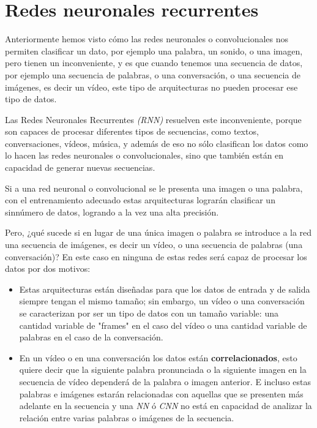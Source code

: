 \documentclass[a4paper,12pt]{article}
\begin{document}
\section{Redes neuronales recurrentes}
Anteriormente hemos visto cómo las redes neuronales o convolucionales nos permiten clasificar un dato, por ejemplo una palabra, un sonido, o una imagen, pero tienen un inconveniente, y es que cuando tenemos una secuencia de datos, por ejemplo una secuencia de palabras, o una conversación, o una secuencia de imágenes, es decir un vídeo, este tipo de arquitecturas no pueden procesar ese tipo de datos. 

Las Redes Neuronales Recurrentes \textit{(RNN)} \citep{karpathy:rnn} resuelven este inconveniente, porque son capaces de procesar diferentes tipos de secuencias, como textos, conversaciones, vídeos, música, y además de eso no sólo clasifican los datos como lo hacen las redes neuronales o convolucionales, sino que también están en capacidad de generar nuevas secuencias.

Si a una red neuronal o convolucional se le presenta una imagen o una palabra, con el entrenamiento adecuado estas arquitecturas lograrán clasificar un sinnúmero de datos, logrando a la vez una alta precisión. 

Pero, ¿qué sucede si en lugar de una única imagen o palabra se introduce a la red una secuencia de imágenes, es decir un vídeo, o una secuencia de palabras (una conversación)? En este caso en ninguna de estas redes será capaz de procesar los datos por dos motivos:
\begin{itemize}
	\item Estas arquitecturas están diseñadas para que los datos de entrada y de salida siempre tengan el mismo tamaño; sin embargo, un vídeo o una conversación se caracterizan por ser un tipo de datos con un tamaño variable: una cantidad variable de "frames"
en el caso del vídeo o una cantidad variable de palabras en el caso de la conversación. 
	\item En un vídeo o en una conversación los datos están \textbf{correlacionados}, esto quiere decir que la siguiente palabra pronunciada o la siguiente imagen en la secuencia de vídeo dependerá de la palabra o imagen anterior. E incluso estas palabras e imágenes estarán relacionadas con aquellas que se presenten más adelante en la secuencia y una \textit{NN} ó \textit{CNN} no está en capacidad de analizar la relación entre varias palabras o imágenes de la secuencia.
\end{itemize}
\end{document}
